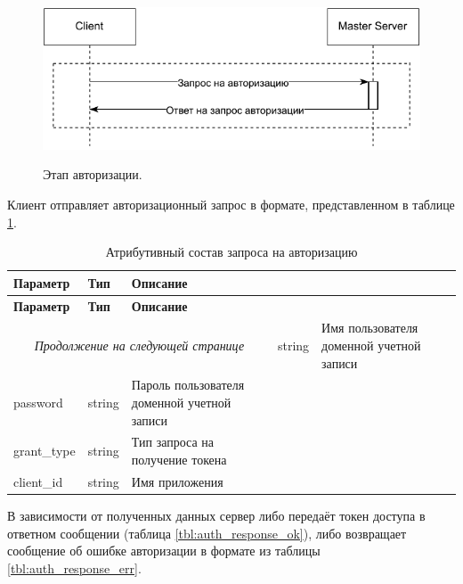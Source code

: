 \begin{figure}[h!]
	\begin{center}
		{\includegraphics[scale = 1]{img/[items][master][auth].pdf}}
		\caption{Этап авторизации.}
		\label{image:auth}
	\end{center}
\end{figure}

Клиент отправляет авторизационный запрос в формате, представленном в таблице \ref{tbl:auth_request}.

\begin{longtable}{|p{4cm}|p{2cm}|p{9.5cm}|}
	\caption{Атрибутивный состав запроса на авторизацию}\label{tbl:auth_request}\\
	\hline
	
	\textbf{Параметр} & \textbf{Тип} & \textbf{Описание}\\ 
	\hline
	\endfirsthead
	
	\hline
	\textbf{Параметр} & \textbf{Тип} & \textbf{Описание}\\ 
	\hline
	\endhead
	
	\hline
	\multicolumn{3}{c}{\textit{Продолжение на следующей странице}}
	\endfoot
	\hline
	\endlastfoot
	
	username &
	string & 
	Имя пользователя доменной учетной записи \\
	
	\hline
	password & 
	string & 
	Пароль пользователя доменной учетной записи \\
	
	\hline
	grant\_type & 
	string & 
	Тип запроса на получение токена \\
	
	\hline
	client\_id & 
	string & 
	Имя приложения \\
\end{longtable} 

В зависимости от полученных данных сервер либо передаёт токен доступа в ответном сообщении (таблица \ref{tbl:auth_response_ok}), либо возвращает сообщение об ошибке авторизации в формате из таблицы \ref{tbl:auth_response_err}.

